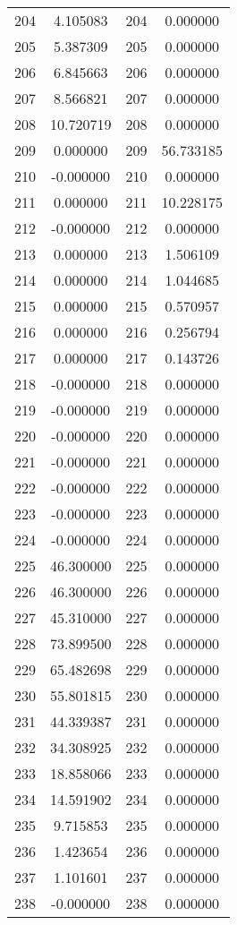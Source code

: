 \documentclass[12pt]{article}
\begin{document}
\begin{longtable}{@{}cccc@{}}
204 & 4.105083 & 204 & 0.000000 \\
205 & 5.387309 & 205 & 0.000000 \\
206 & 6.845663 & 206 & 0.000000 \\
207 & 8.566821 & 207 & 0.000000 \\
208 & 10.720719 & 208 & 0.000000 \\
209 & 0.000000 & 209 & 56.733185 \\
210 & -0.000000 & 210 & 0.000000 \\
211 & 0.000000 & 211 & 10.228175 \\
212 & -0.000000 & 212 & 0.000000 \\
213 & 0.000000 & 213 & 1.506109 \\
214 & 0.000000 & 214 & 1.044685 \\
215 & 0.000000 & 215 & 0.570957 \\
216 & 0.000000 & 216 & 0.256794 \\
217 & 0.000000 & 217 & 0.143726 \\
218 & -0.000000 & 218 & 0.000000 \\
219 & -0.000000 & 219 & 0.000000 \\
220 & -0.000000 & 220 & 0.000000 \\
221 & -0.000000 & 221 & 0.000000 \\
222 & -0.000000 & 222 & 0.000000 \\
223 & -0.000000 & 223 & 0.000000 \\
224 & -0.000000 & 224 & 0.000000 \\
225 & 46.300000 & 225 & 0.000000 \\
226 & 46.300000 & 226 & 0.000000 \\
227 & 45.310000 & 227 & 0.000000 \\
228 & 73.899500 & 228 & 0.000000 \\
229 & 65.482698 & 229 & 0.000000 \\
230 & 55.801815 & 230 & 0.000000 \\
231 & 44.339387 & 231 & 0.000000 \\
232 & 34.308925 & 232 & 0.000000 \\
233 & 18.858066 & 233 & 0.000000 \\
234 & 14.591902 & 234 & 0.000000 \\
235 & 9.715853 & 235 & 0.000000 \\
236 & 1.423654 & 236 & 0.000000 \\
237 & 1.101601 & 237 & 0.000000 \\
238 & -0.000000 & 238 & 0.000000 \\

\end{longtable}
\end{document}
